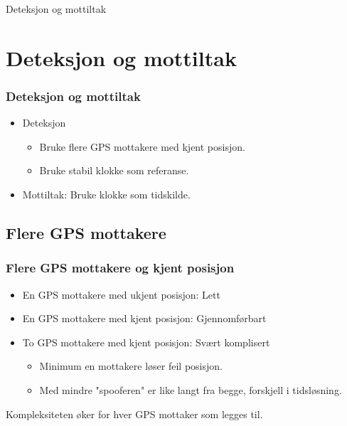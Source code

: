 \documentclass[xcolor=table]{beamer}
\begin{document}
\begin{frame}
\centering
Deteksjon og mottiltak
\end{frame}

\section{Deteksjon og mottiltak}
\begin{frame}
\frametitle{Deteksjon og mottiltak}
  \begin{itemize}
    \item Deteksjon
    \begin{itemize}
      \item Bruke flere GPS mottakere med kjent posisjon.
      \item Bruke stabil klokke som referanse.
    \end{itemize}
    \item Mottiltak: Bruke klokke som tidskilde.
  \end{itemize}
\end{frame}

\subsection{Flere GPS mottakere}
\begin{frame} 
  \frametitle{Flere GPS mottakere og kjent posisjon}
  \begin{itemize}
    \item En GPS mottakere med ukjent posisjon: Lett
    \item En GPS mottakere med kjent posisjon: Gjennomførbart
    \item To GPS mottakere med kjent posisjon: Svært komplisert
    \begin{itemize}
      \item Minimum en mottakere løser feil posisjon.
      \item Med mindre "spooferen" er like langt fra begge, forskjell i tidsløsning.  
    \end{itemize}
  \end{itemize}
  Kompleksiteten øker for hver GPS mottaker som legges til.
\end{frame}
\end{document}

